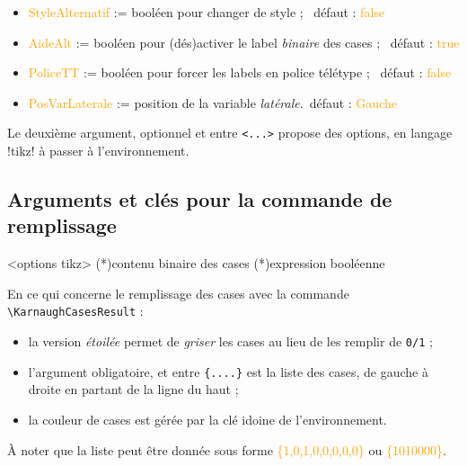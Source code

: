 \documentclass[french,a4paper,11pt]{article}
\newcommand\Cle[1]{{\small\sffamily\textlangle \textcolor{orange}{#1}\textrangle}}
\begin{document}
{{\begin{tipblock}
\begin{itemize}
	\hfill~défaut : \Cle{black}
	\item \Cle{StyleAlternatif} := booléen pour changer de style ; \hfill~défaut : \Cle{false}
	\item \Cle{AideAlt} := booléen pour (dés)activer le label \textit{binaire} des cases ; \hfill~défaut : \Cle{true}
	\item \Cle{PoliceTT} := booléen pour forcer les labels en police télétype ; \hfill~défaut : \Cle{false}
	\item \Cle{PosVarLaterale} := position de la variable \textit{latérale}.\hfill~défaut : \Cle{Gauche}
\end{itemize}

Le deuxième argument, optionnel et entre \texttt{<...>} propose des options, en langage \packagetex!tikz! à passer à l'environnement.
\end{tipblock}

\subsection{Arguments et clés pour la commande de remplissage}

\begin{DemoCode}
\begin{TableKarnaugh}[clés]<options tikz>
	\KarnaughCasesResult(*){contenu binaire des cases}
	\KarnaughCasesAuto(*){expression booléenne}
\end{TableKarnaugh}
\end{DemoCode}

\begin{tipblock}
En ce qui concerne le remplissage des cases avec la commande \texttt{\textbackslash KarnaughCasesResult} :

\begin{itemize}
	\item la version \textit{étoilée} permet de \textit{griser} les cases au lieu de les remplir de \texttt{0/1} ;
	\item l'argument obligatoire, et entre \texttt{\{....\}} est la liste des cases, de gauche à droite en partant de la ligne du haut ;
	\item la couleur de cases est gérée par la clé idoine de l'environnement.
\end{itemize}

À noter que la liste peut être donnée sous forme \Cle{\{1,0,1,0,0,0,0,0\}} ou \Cle{\{1010000\}}.
\end{tipblock}

}}
\end{document}
